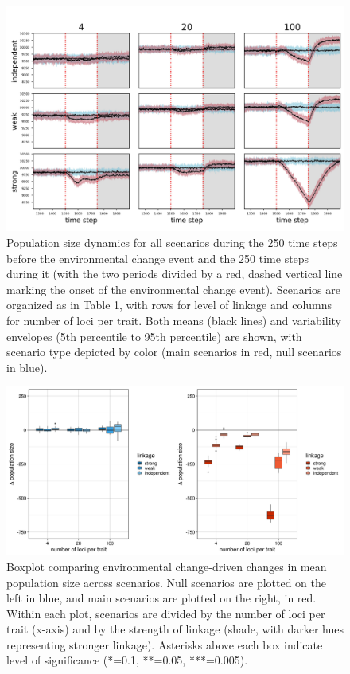 \documentclass[9pt,twocolumn,twoside,lineno]{pnas-new}
\begin{document}
\begin{figure}
\centering
\includegraphics[width=11.4cm]{Nt_over_time.jpg}
\caption{Population size dynamics for all scenarios during the 250 time steps before the environmental change event and the 250 time steps during it (with the two periods divided by a red, dashed vertical line marking the onset of the environmental change event). Scenarios are organized as in Table 1, with rows for level of linkage and columns for number of loci per trait. Both means (black lines) and variability envelopes (5th percentile to 95th percentile) are shown, with scenario type depicted by color (main scenarios in red, null scenarios in blue).}
\label{fig:Nt_over_time}
\end{figure}

\begin{figure}
\centering
\includegraphics[width=11.4cm]{Nt_boxplot.jpg}
\caption{Boxplot comparing environmental change-driven changes in mean population size across scenarios. Null scenarios are plotted on the left in blue, and main scenarios are plotted on the right, in red. Within each plot, scenarios are divided by the number of loci per trait (x-axis) and by the strength of linkage (shade, with darker hues representing stronger linkage). Asterisks above each box indicate level of significance (*=0.1, **=0.05, ***=0.005).}
\label{fig:Nt_boxplot}
\end{figure}
\end{document}
